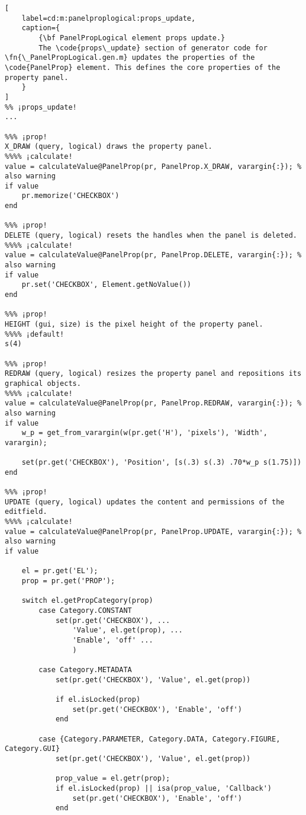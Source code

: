 \documentclass{tufte-handout}
\begin{document}
\begin{lstlisting}[
	label=cd:m:panelproplogical:props_update,
	caption={
		{\bf PanelPropLogical element props update.}
		The \code{props\_update} section of generator code for \fn{\_PanelPropLogical.gen.m} updates the properties of the \code{PanelProp} element. This defines the core properties of the property panel.
	}
]
%% ¡props_update!
...

%%% ¡prop!
X_DRAW (query, logical) draws the property panel.
%%%% ¡calculate!
value = calculateValue@PanelProp(pr, PanelProp.X_DRAW, varargin{:}); % also warning
if value
    pr.memorize('CHECKBOX')
end

%%% ¡prop!
DELETE (query, logical) resets the handles when the panel is deleted.
%%%% ¡calculate!
value = calculateValue@PanelProp(pr, PanelProp.DELETE, varargin{:}); % also warning
if value
    pr.set('CHECKBOX', Element.getNoValue())
end

%%% ¡prop!
HEIGHT (gui, size) is the pixel height of the property panel.
%%%% ¡default!
s(4)

%%% ¡prop!
REDRAW (query, logical) resizes the property panel and repositions its graphical objects.
%%%% ¡calculate!
value = calculateValue@PanelProp(pr, PanelProp.REDRAW, varargin{:}); % also warning
if value
    w_p = get_from_varargin(w(pr.get('H'), 'pixels'), 'Width', varargin);
    
    set(pr.get('CHECKBOX'), 'Position', [s(.3) s(.3) .70*w_p s(1.75)])
end    

%%% ¡prop!
UPDATE (query, logical) updates the content and permissions of the editfield.
%%%% ¡calculate!
value = calculateValue@PanelProp(pr, PanelProp.UPDATE, varargin{:}); % also warning
if value

    el = pr.get('EL');
    prop = pr.get('PROP');
    
    switch el.getPropCategory(prop)
        case Category.CONSTANT
            set(pr.get('CHECKBOX'), ...
                'Value', el.get(prop), ...
                'Enable', 'off' ...
                )

        case Category.METADATA
            set(pr.get('CHECKBOX'), 'Value', el.get(prop))

            if el.isLocked(prop)
                set(pr.get('CHECKBOX'), 'Enable', 'off')
            end
            
        case {Category.PARAMETER, Category.DATA, Category.FIGURE, Category.GUI}
            set(pr.get('CHECKBOX'), 'Value', el.get(prop))

            prop_value = el.getr(prop);
            if el.isLocked(prop) || isa(prop_value, 'Callback')
                set(pr.get('CHECKBOX'), 'Enable', 'off')
            end
            

\end{lstlisting}
\end{document}
